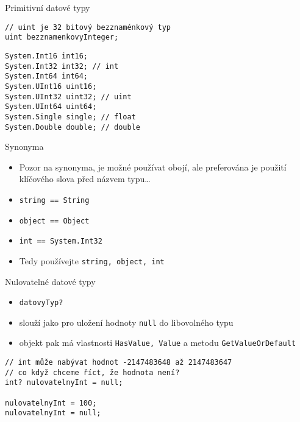 

\begin{frame}[fragile]
\begin{exampleblock}{Primitivní datové typy}
\begin{lstlisting}
// uint je 32 bitový bezznaménkový typ
uint bezznamenkovyInteger;
\end{lstlisting}
\end{exampleblock}

\begin{bonusblock}{}
\begin{lstlisting}
System.Int16 int16;
System.Int32 int32; // int
System.Int64 int64;
System.UInt16 uint16;
System.UInt32 uint32; // uint
System.UInt64 uint64;
System.Single single; // float
System.Double double; // double
\end{lstlisting}
\end{bonusblock}
\end{frame}


\begin{frame}[fragile]
\begin{block}{Synonyma}
\begin{itemize}
\item Pozor na synonyma, je možné používat obojí, ale preferována je použití klíčového slova před názvem typu\ldots
\item \lstinline|string == String|
\item \lstinline|object == Object|
\item \lstinline|int == System.Int32|
\item Tedy používejte \lstinline|string, object, int|
\end{itemize}
\end{block}
\end{frame}

\begin{frame}[fragile]
\begin{block}{Nulovatelné datové typy}
\begin{itemize}
\item \lstinline|datovyTyp?|
\item slouží jako  pro uložení hodnoty \lstinline|null| do libovolného typu
\item objekt pak má vlastnosti \lstinline|HasValue, Value| a metodu \lstinline|GetValueOrDefault|
\end{itemize}
\end{block}

\begin{yesblock}
\begin{lstlisting}
// int může nabývat hodnot -2147483648 až 2147483647
// co když chceme říct, že hodnota není?
int? nulovatelnyInt = null;

nulovatelnyInt = 100;
nulovatelnyInt = null;

\end{lstlisting}
\end{yesblock}
\end{frame}




